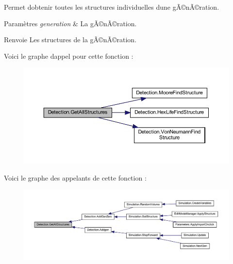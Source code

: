 Permet d\textquotesingle{}obtenir toutes les structures individuelles d\textquotesingle{}une gÃ©nÃ©ration. 


\begin{DoxyParams}{Paramètres}
{\em generation} & La gÃ©nÃ©ration.\\
\hline
\end{DoxyParams}
\begin{DoxyReturn}{Renvoie}
Les structures de la gÃ©nÃ©ration.
\end{DoxyReturn}
Voici le graphe d\textquotesingle{}appel pour cette fonction \+:
\nopagebreak
\begin{figure}[H]
\begin{center}
\leavevmode
\includegraphics[width=350pt]{class_detection_a56dffa1e7a06c20bfaa24ac287a9883f_cgraph}
\end{center}
\end{figure}
Voici le graphe des appelants de cette fonction \+:
\nopagebreak
\begin{figure}[H]
\begin{center}
\leavevmode
\includegraphics[width=350pt]{class_detection_a56dffa1e7a06c20bfaa24ac287a9883f_icgraph}
\end{center}
\end{figure}
\mbox{\label{class_detection_a5fa3f90802c6cc9eb57c9ca7bcf417b8}} 
